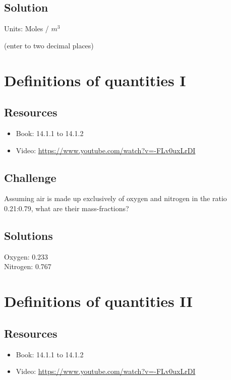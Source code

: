 \subsection*{Solution}
Units: Moles / $m^3$

(enter to two decimal places)





\newpage
\section{Definitions of quantities I}

\subsection*{Resources}
\begin{itemize}
    \item Book: 14.1.1 to 14.1.2
    \item Video: \url{https://www.youtube.com/watch?v=-FLv0uxLrDI}
\end{itemize}

\subsection*{Challenge}
Assuming air is made up exclusively of oxygen and nitrogen in the ratio 0.21:0.79, what are their mass-fractions?

\subsection*{Solutions}
Oxygen: 0.233 \\
Nitrogen: 0.767




\newpage
\section{Definitions of quantities II}

\subsection*{Resources}
\begin{itemize}
    \item Book: 14.1.1 to 14.1.2
    \item Video: \url{https://www.youtube.com/watch?v=-FLv0uxLrDI}
\end{itemize}

